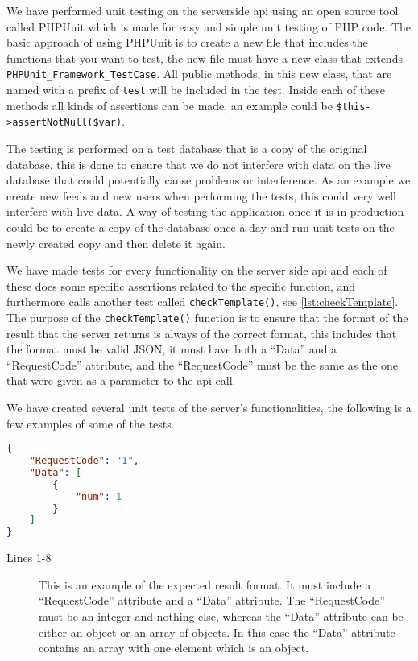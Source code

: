 We have performed unit testing on the serverside \ac{api} using an open source tool called PHPUnit which is made for easy and simple unit testing of PHP code. The basic approach of using PHPUnit is to create a new file that includes the functions that you want to test, the new file must have a new class that extends \lstinline|PHPUnit_Framework_TestCase|. All public methods, in this new class, that are named with a prefix of \lstinline|test| will be included in the test. Inside each of these methods all kinds of assertions can be made, an example could be \lstinline|$this->assertNotNull($var)|\citep{phpunit}.

The testing is performed on a test database that is a copy of the original database, this is done to ensure that we do not interfere with data on the live database that could potentially cause problems or interference. As an example we create new feeds and new users when performing the tests, this could very well interfere with live data. A way of testing the application once it is in production could be to create a copy of the database once a day and run unit tests on the newly created copy and then delete it again.

We have made tests for every functionality on the server side \ac{api} and each of these does some specific assertions related to the specific function, and furthermore calls another test called \lstinline|checkTemplate()|, see \autoref{lst:checkTemplate}. The purpose of the \lstinline|checkTemplate()| function is to ensure that the format of the result that the server returns is always of the correct format, this includes that the format must be valid JSON, it must have both a ``Data'' and a ``RequestCode'' attribute, and the ``RequestCode'' must be the same as the one that were given as a parameter to the \ac{api} call.

We have created several unit tests of the server's functionalities, the following is a few examples of some of the tests.

\begin{lstlisting}[language=json, label=lst:jsonFormat, caption={JSON format, in this case an example of the result from \lstinline|CheckFeeds|}]
{
    "RequestCode": "1",
    "Data": [
        {
            "num": 1
        }
    ]
}
\end{lstlisting}
\begin{description}
\item[Lines 1-8] This is an example of the expected result format. It must include a ``RequestCode'' attribute and a ``Data'' attribute. The ``RequestCode'' must be an integer and nothing else, whereas the ``Data'' attribute can be either an object or an array of objects. In this case the ``Data'' attribute contains an array with one element which is an object.
\end{description}

